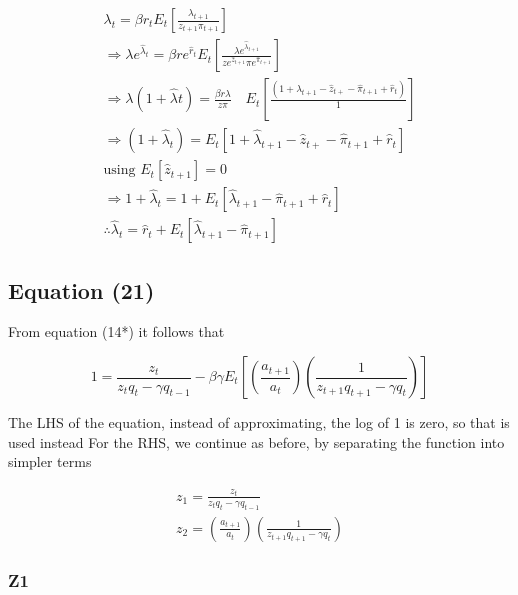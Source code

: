 \documentclass[11pt,preprint, authoryear]{elsarticle}
\numberwithin{equation}{section}
\numberwithin{figure}{section}
\numberwithin{table}{section}
\begin{document}
\[\begin{array}{l}
\lambda_{t}=\beta r_{t} E_{t}\left[\frac{\lambda_{t+1}}{z_{t+1} \pi_{t+1}}\right]\\
\Rightarrow \lambda e^{\hat{\lambda}_t}=\beta r e^{\hat{r}_{t}} E_{t}\left[\frac{\lambda e^{\hat{\lambda}_{t+1}}}{z e^{\hat{z}_{t+1}} \pi e^{\hat{\pi}_{t+1}}} \right]\\
\Rightarrow \lambda\left(1+\hat{\lambda}{t}\right)=\frac{\beta r \lambda}{z \pi} \quad E_{t}\left[\frac{\left(1+\hat{\lambda}_{t+1}-\hat{z}_{t+}-\hat{\pi}_{t+1}+\hat{r}_{t}\right)}{1}\right]\\
\Rightarrow \left(1+\hat{\lambda}_{t}\right)= E_{t}\left[1+\hat{\lambda}_{t+1}-\hat{z}_{t+}-\hat{\pi}_{t+1}+\hat{r}_{t}\right]\\
\text{using }{ E_t }[\hat{z}_{t+1}]=0\\
\Rightarrow 1+\hat{\lambda}_{t} = 1+E_{t}\left[\hat{\lambda}_{t+1}-\hat{\pi}_{t+1}+\hat{r}_{t}\right]\\
\therefore \hat{\lambda}_{t}=\hat{r}_{t}+E_{t}\left[\hat{\lambda}_{t+1} - \hat{\pi}_{t+1}\right]
\end{array}\]

\hypertarget{equation-21}{%
\subsection{Equation (21)}\label{equation-21}}

From equation (14*) it follows that

\[1=\frac{z_{t}}{z_{t} q_{t}-\gamma q_{t-1}}-\beta \gamma E_{t}\left[\left(\frac{a_{t+1}}{a_{t}}\right)\left(\frac{1}{z_{t+1} q_{t+1}-\gamma q_{t}}\right)\right]\]

The LHS of the equation, instead of approximating, the log of 1 is zero,
so that is used instead For the RHS, we continue as before, by
separating the function into simpler terms

\[\begin{aligned}
z_1 = \frac{z_{t}}{z_{t} q_{t}-\gamma q_{t-1}} \\
z_2 = \left(\frac{a_{t+1}}{a_{t}}\right)\left(\frac{1}{z_{t+1} q_{t+1}-\gamma q_{t}}\right)
\end{aligned}\]

\hypertarget{z1}{%
\subsubsection{Z1}\label{z1}}
\end{document}
